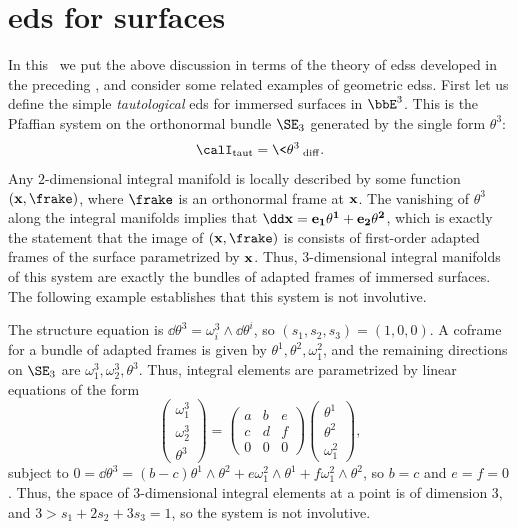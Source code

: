 \section{\texorpdfstring{\gls{eds}}{EDS} for surfaces}


In this \sect\ we put the above discussion in terms of the theory of \glspl{eds} developed in the preceding \chap, and consider some related examples of geometric \glspl{eds}. First let us define the simple \emph{tautological} \gls{eds} for immersed surfaces in $\bbE^3$. This is the Pfaffian system on the orthonormal bundle $\SE_3$ generated by the single form $\theta^3$:
\[\calI_{\mathrm{taut}}=\<\theta^3\>_{\mathrm{diff}}.\]
Any $2$-dimensional integral manifold is locally described by some function $(\bf{x},\frake)$, where $\frake$ is an orthonormal frame at $\bf{x}$. The vanishing of $\theta^3$ along the integral manifolds implies that $\dd \bf{x}=e_1\theta^1+e_2\theta^2$, which is exactly the statement that the image of $(\bf{x},\frake)$ is consists of first-order adapted frames of the surface parametrized by $\bf{x}$. Thus, $3$-dimensional integral manifolds of this system are exactly the bundles of adapted frames of immersed surfaces. The following example establishes that this system is not involutive.

\begin{example}
    The structure equation is $\dd\theta^3=\omega^3_i\wedge\dd\theta^i$, so $(s_1,s_2,s_3)=(1,0,0)$. A coframe for a bundle of adapted frames is given by $\theta^1,\theta^2,\omega^2_1$, and the remaining directions on $\SE_3$ are $\omega^3_1,\omega^3_2,\theta^3$. Thus, integral elements are parametrized by linear equations of the form 
    \[
    \begin{pmatrix}
        \omega^3_1\\
        \omega^3_2\\
        \theta^3
    \end{pmatrix}=
    \begin{pmatrix}
        a & b & e \\
        c & d & f \\
        0 & 0 & 0
    \end{pmatrix}
    \begin{pmatrix}
        \theta^1\\\theta^2\\\omega^2_1
    \end{pmatrix},
    \]
    subject to $0=\dd\theta^3=(b-c)\theta^1\wedge\theta^2+e\omega^2_1\wedge\theta^1+f\omega^2_1\wedge\theta^2$, so $b=c$ and $e=f=0$. Thus, the space of $3$-dimensional integral elements at a point is of dimension $3$, and $3>s_1+2s_2+3s_3=1$, so the system is not involutive.
\end{example}

